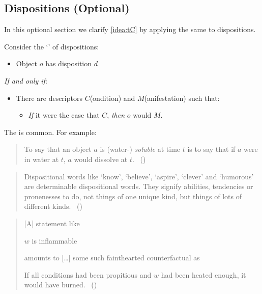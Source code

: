 \subsection[Dispositions]{Dispositions \hfill (Optional)}
\label{sec:dispositions}

\begin{note}
  In this optional section we clarify \autoref{idea:tC} by applying the same to dispositions.
\end{note}

\begin{note}
  Consider the `' of dispositions:%

  \begin{sketch}
    \label{sketch:dBCA}
    \vspace{-\baselineskip}
    \begin{itemize}
    \item
      Object \(o\) has disposition \(d\)
    \end{itemize}
    \emph{If and only if}:
    \begin{itemize}
    \item
      There are descriptors \(C\)(ondition) and \(M\)(anifestation) such that:
      \begin{itemize}
      \item
        \emph{If} it were the case that \(C\), \emph{then} \(o\) would \(M\).
      \end{itemize}
    \end{itemize}
    \vspace{-\baselineskip}
  \end{sketch}

  \noindent%
  The  is common.
  For example:

  \begin{quote}
    To say that an object \(a\) is (water-) \emph{soluble} at time \(t\) is to say that if \(a\) were in water at \(t\), \(a\) would dissolve at \(t\).%
    \mbox{ }\hfill\mbox{(\cite[203]{Quine:2013aa})}
  \end{quote}

  \begin{quote}
    Dispositional words like `know', `believe', `aspire', `clever' and `humorous' are determinable dispositional words.
    They signify abilities, tendencies or pronenesses to do, not things of one unique kind, but things of lots of different kinds.%
    \mbox{ }\hfill\mbox{(\cite[118]{Ryle:1949aa})}
  \end{quote}

  \begin{quote}
    [A] statement like

    \(w\) is inflammable

    amounts to [\dots] some such fainthearted counterfactual as

    If all conditions had been propitious and \(w\) had been heated enough, it would have burned.%
    \mbox{ }\hfill\mbox{(\cite[39]{Goodman:1983aa})}
  \end{quote}
\end{note}

